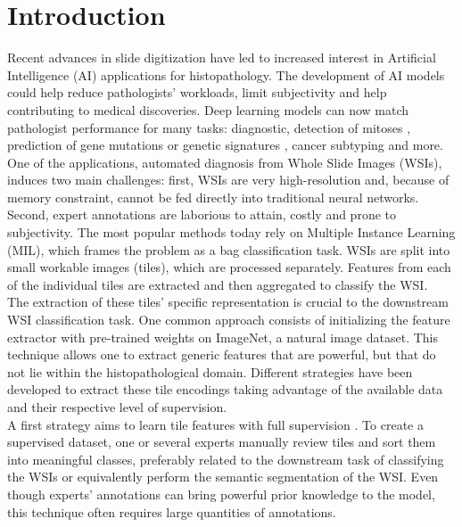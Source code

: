 \section{Introduction}

Recent advances in slide digitization have led to increased  interest in Artificial Intelligence (AI) applications for histopathology. The development of AI models could help reduce pathologists’ workloads, limit subjectivity and help contributing to medical discoveries. Deep learning models can now match pathologist performance for many tasks: diagnostic, detection of mitoses \citep{veta_assessment_2015}, prediction of gene mutations \citep{coudray_classification_2018, kather_pan-cancer_2020} or genetic signatures \citep{kather_pan-cancer_2020, diao_human-interpretable_2021,lazard_deep_2021}, cancer subtyping \citep{coudray_classification_2018} and more. \\
One of the applications, automated diagnosis from Whole Slide Images (WSIs), induces two main challenges: first, WSIs are very high-resolution and, because of memory constraint, cannot be fed directly into traditional neural networks. Second, expert annotations are laborious to attain, costly and prone to subjectivity. The most popular methods today rely on Multiple Instance Learning (MIL), which frames the problem as a bag classification task. WSIs are split into small workable images (tiles), which are processed separately. Features from each of the individual tiles are extracted and then aggregated to classify the WSI. \\
The extraction of these tiles’ specific representation is crucial to the downstream WSI classification task. One common approach consists of initializing the feature extractor with pre-trained weights on ImageNet, a natural image dataset. This technique allows one to extract generic features that are powerful, but that do not lie within the histopathological domain. Different strategies have been developed to extract these tile encodings taking advantage of the available data and their respective level of supervision. \\
A first strategy aims to learn tile features with full supervision \citep{ehteshami_bejnordi_diagnostic_2017}. To create a supervised dataset, one or several experts manually review tiles and sort them into meaningful classes, preferably related to the downstream task of classifying the WSIs or equivalently perform the semantic segmentation of the WSI. Even though experts' annotations can bring powerful prior knowledge to the model, this technique often requires large quantities of annotations. \\
